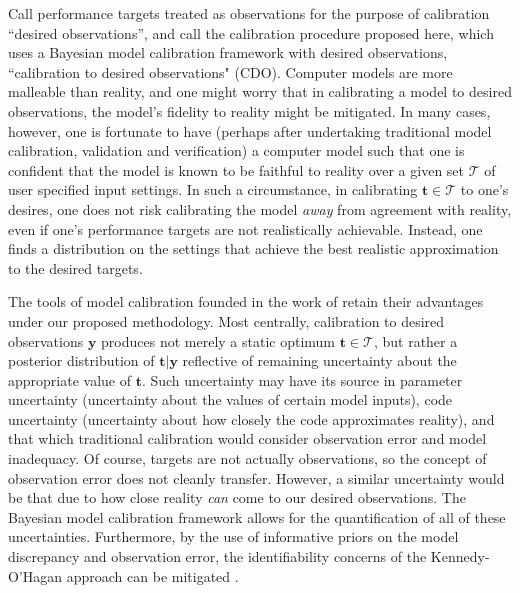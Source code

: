 \documentclass[12pt]{article}
\begin{document}
%
%
Call performance targets treated as observations for the purpose of calibration ``desired observations'', and call the calibration procedure proposed here, which uses a Bayesian model calibration framework with desired observations, ``calibration to desired observations" (CDO). 
%
Computer models are more malleable than reality, and one might worry that in calibrating a model to desired observations, the model's fidelity to reality might be mitigated.
%
%
In many cases, however, one is fortunate to have (perhaps after undertaking traditional model calibration, validation and verification) a computer model such that one is confident that the model is known to be faithful to reality over a given set $\mathcal T$ of user specified input settings.
%
In such a circumstance, in calibrating $\mathbf t\in\mathcal T$ to one's desires, one does not risk calibrating the model \emph{away} from agreement with reality, even if one's performance targets are not realistically achievable. 
%
Instead, one finds a distribution on the settings that achieve the best realistic approximation to the desired targets.

The tools of model calibration founded in the work of \cite{Kennedy2001} retain their advantages under our proposed methodology.
%
Most centrally, calibration to desired observations $\mathbf y$ produces not merely a static optimum $\mathbf t\in\mathcal T$, but rather a posterior distribution of $\mathbf t|\mathbf y$ reflective of remaining uncertainty about the appropriate value of $\mathbf t$. 
%
Such uncertainty may have its source in parameter uncertainty (uncertainty about the values of certain model inputs), code uncertainty (uncertainty about how closely the code approximates reality), and that which traditional calibration would consider observation error and model inadequacy. 
%
Of course,  targets are not actually observations, so the concept of observation error does not cleanly transfer. 
%
However, a similar uncertainty would be that due to how close reality \emph{can} come to our desired observations. 
%
The Bayesian model calibration framework allows for the quantification of all of these uncertainties. 
%
Furthermore, by the use of informative priors on the model discrepancy and observation error, the identifiability concerns of the Kennedy-O'Hagan approach can be mitigated \citep{Bayarri2007,Tuo2016}.
\end{document}
